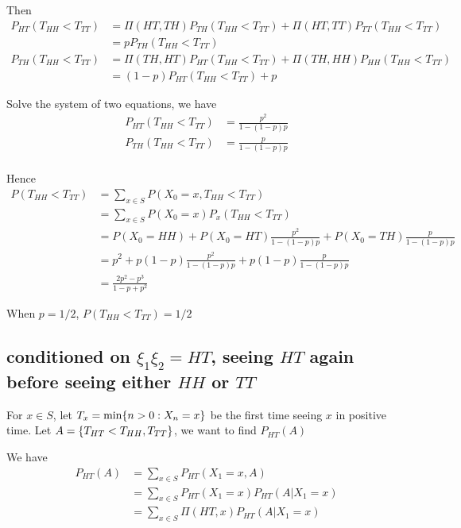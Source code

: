 \documentclass{article}
\begin{document}
Then
\begin{align*}
    P_{HT}(T_{HH} < T_{TT})
    &= \Pi(HT, TH) P_{TH}(T_{HH} < T_{TT}) + \Pi(HT, TT) P_{TT}(T_{HH} < T_{TT}) \\
    &= p P_{TH}(T_{HH} < T_{TT}) \\
    P_{TH}(T_{HH} < T_{TT})
    &= \Pi(TH, HT) P_{HT}(T_{HH} < T_{TT})  + \Pi(TH, HH) P_{HH}(T_{HH} < T_{TT}) \\
    &= (1-p) P_{HT}(T_{HH} < T_{TT}) + p
\end{align*}

Solve the system of two equations, we have
\begin{align*}
    P_{HT}(T_{HH} < T_{TT}) &= \frac{p^2}{1 - (1-p)p}\\
    P_{TH}(T_{HH} < T_{TT}) &= \frac{p}{1 - (1-p)p} \\
\end{align*}

Hence
\begin{align}
    P(T_{HH} < T_{TT})
    &= \sum_{x \in S} P(X_0 = x, T_{HH} < T_{TT}) \\
    &= \sum_{x \in S} P(X_0 = x) P_x(T_{HH} < T_{TT}) \\
    &= P(X_0 = HH) + P(X_0 = HT) \frac{p^2}{1 - (1-p)p} + P(X_0 = TH) \frac{p}{1 - (1-p)p} \\
    &= p^2 + p(1-p) \frac{p^2}{1 - (1-p)p} + p(1-p) \frac{p}{1 - (1-p)p} \\
    &= \frac{2 p^2 - p^3}{1 - p + p^2}
\end{align}

When $p = 1/2$, $P(T_{HH} < T_{TT}) = 1/2$

\subsection{conditioned on $\xi_1 \xi_2 = HT$, seeing $HT$ again before seeing either $HH$ or $TT$}

For $x \in S$, let $T_x = \min \{n > 0: X_n = x\}$ be the first time seeing $x$ in positive time. Let $A = \{T_{HT} < T_{HH}, T_{TT}\}$, we want to find $P_{HT}(A)$

We have
\begin{align*}
    P_{HT}(A)
    &= \sum_{x \in S} P_{HT}(X_1=x, A) \\
    &= \sum_{x \in S} P_{HT}(X_1 = x) P_{HT}(A | X_1=x) \\
    &= \sum_{x \in S} \Pi(HT, x) P_{HT}(A | X_1=x)
\end{align*}
\end{document}
